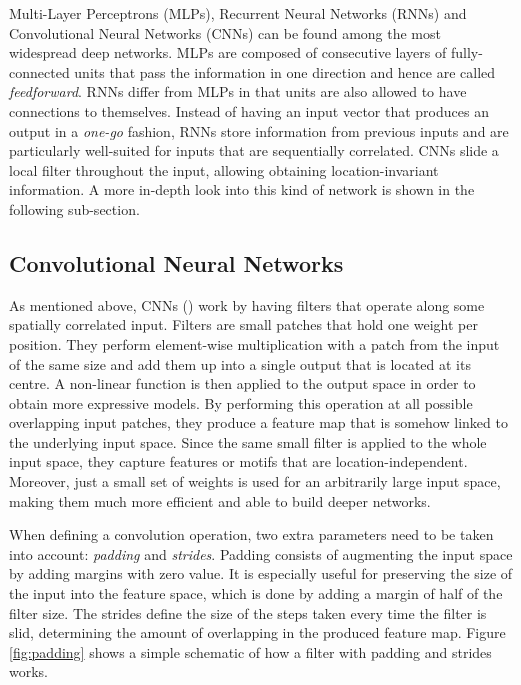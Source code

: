 Multi-Layer Perceptrons (MLPs), Recurrent Neural Networks (RNNs) and Convolutional Neural Networks (CNNs) can be found among the most widespread deep networks. MLPs are composed of consecutive layers of fully-connected units that pass the information in one direction and hence are called \textit{feedforward}. RNNs differ from MLPs in that units are also allowed to have connections to themselves. Instead of having an input vector that produces an output in a \textit{one-go} fashion, RNNs store information from previous inputs and are particularly well-suited for inputs that are sequentially correlated. CNNs slide a local filter throughout the input, allowing obtaining location-invariant information. A more in-depth look into this kind of network is shown in the following sub-section.

\subsection{Convolutional Neural Networks} \label{sect:cnn}
As mentioned above, CNNs (\cite{LeCun1998}) work by having filters that operate along some spatially correlated input. Filters are small patches that hold one weight per position. They perform element-wise multiplication with a patch from the input of the same size and add them up into a single output that is located at its centre. A non-linear function is then applied to the output space in order to obtain more expressive models. By performing this operation at all possible overlapping input patches, they produce a feature map that is somehow linked to the underlying input space. Since the same small filter is applied to the whole input space, they capture features or motifs that are location-independent. Moreover, just a small set of weights is used for an arbitrarily large input space, making them much more efficient and able to build deeper networks.

When defining a convolution operation, two extra parameters need to be taken into account: \textit{padding} and \textit{strides}. Padding consists of augmenting the input space by adding margins with zero value. It is especially useful for preserving the size of the input into the feature space, which is done by adding a margin of half of the filter size. The strides define the size of the steps taken every time the filter is slid, determining the amount of overlapping in the produced feature map. Figure \ref{fig:padding} shows a simple schematic of how a filter with padding and strides works.

